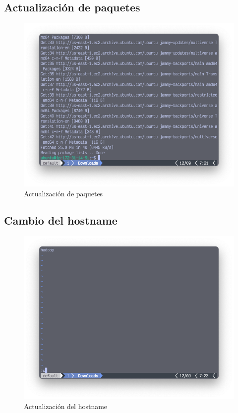 \subsection{Actualización de paquetes}
\begin{figure}[h]
	\centering
	\includegraphics[scale=.35] {img/13-update}
	\caption{Actualización de paquetes }
	\label{fig:13}	
\end{figure}

\subsection{Cambio del hostname}
\begin{figure}[h]
	\centering
	\includegraphics[scale=.35] {img/14-hostname}
	\caption{Actualización del hostname}
	\label{fig:14}	
\end{figure}

